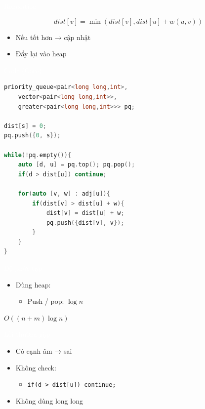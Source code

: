 \documentclass{beamer}
\newcommand{\hlblue}[1]{\textcolor{myblue}{#1}}
\newcommand{\hlred}[1]{\textcolor{myred}{#1}}
\newcommand{\hlwhite}[1]{\textcolor{white}{#1}}
\begin{document}

\begin{frame}{\hlwhite{Relaxation}}
\begin{tcolorbox}
\centering
\[
dist[v] = \min(dist[v], dist[u] + w(u,v))
\]
\end{tcolorbox}

\begin{itemize}
\item Nếu tốt hơn → cập nhật
\item Đẩy lại vào heap
\end{itemize}
\end{frame}


\begin{frame}[fragile]{\hlwhite{Code (Core)}}
\begin{lstlisting}[language=C++]
priority_queue<pair<long long,int>,
    vector<pair<long long,int>>,
    greater<pair<long long,int>>> pq;

dist[s] = 0;
pq.push({0, s});

while(!pq.empty()){
    auto [d, u] = pq.top(); pq.pop();
    if(d > dist[u]) continue;

    for(auto [v, w] : adj[u]){
        if(dist[v] > dist[u] + w){
            dist[v] = dist[u] + w;
            pq.push({dist[v], v});
        }
    }
}
\end{lstlisting}
\end{frame}


\begin{frame}{\hlwhite{Độ phức tạp}}
\begin{itemize}
\item Dùng heap:
\begin{itemize}
\item Push / pop: $\log n$
\end{itemize}
\end{itemize}

\begin{tcolorbox}
\centering
\hlred{$O((n + m)\log n)$}
\end{tcolorbox}
\end{frame}


\begin{frame}{\hlwhite{Lỗi thường gặp}}
\begin{itemize}
\item \hlred{Có cạnh âm → sai}
\item Không check:
\begin{itemize}
\item \texttt{if(d > dist[u]) continue;}
\end{itemize}
\item Không dùng \hlblue{long long}
\end{itemize}
\end{frame}
\end{document}
